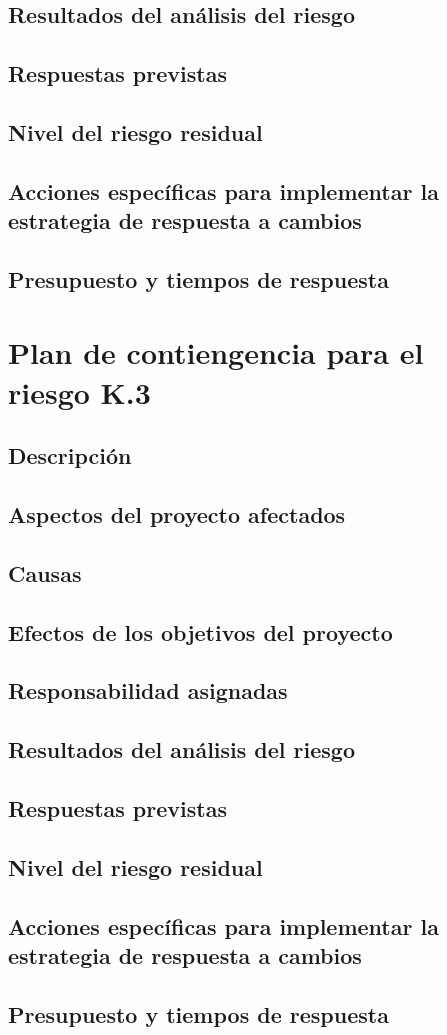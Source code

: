 \documentclass[11pt,a4paper,spanish,twoside]{report}
\begin{document}
\subsection{Resultados del análisis del riesgo}
\subsection{Respuestas previstas}
\subsection{Nivel del riesgo residual}
\subsection{Acciones específicas para implementar la estrategia de respuesta
a cambios}
\subsection{Presupuesto y tiempos de respuesta}

\section{Plan de contiengencia para el riesgo K.3}
\subsection{Descripción}
\subsection{Aspectos del proyecto afectados}
\subsection{Causas}
\subsection{Efectos de los objetivos del proyecto}
\subsection{Responsabilidad asignadas}
\subsection{Resultados del análisis del riesgo}
\subsection{Respuestas previstas}
\subsection{Nivel del riesgo residual}
\subsection{Acciones específicas para implementar la estrategia de respuesta
a cambios}
\subsection{Presupuesto y tiempos de respuesta}
\end{document}
